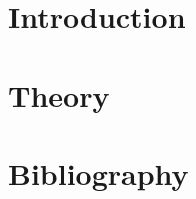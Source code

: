 \documentclass[11pt]{article}
\begin{document}
\maketitle{\blindtext}
\section{Introduction}
\blindtext
\section{Theory}
\blindtext
\section{Bibliography}
\end{document}
